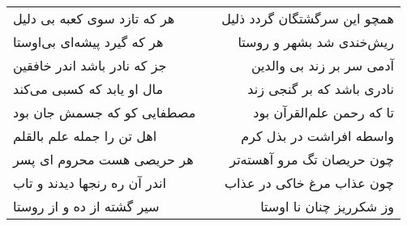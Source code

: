 \begin{center}
\begin{longtable}{l p{0.5cm} r}
هر که تازد سوی کعبه بی دلیل
&&
همچو این سرگشتگان گردد ذلیل
\\
هر که گیرد پیشه‌ای بی‌اوستا
&&
ریش‌خندی شد بشهر و روستا
\\
جز که نادر باشد اندر خافقین
&&
آدمی سر بر زند بی والدین
\\
مال او یابد که کسبی می‌کند
&&
نادری باشد که بر گنجی زند
\\
مصطفایی کو که جسمش جان بود
&&
تا که رحمن علم‌القرآن بود
\\
اهل تن را جمله علم بالقلم
&&
واسطه افراشت در بذل کرم
\\
هر حریصی هست محروم ای پسر
&&
چون حریصان تگ مرو آهسته‌تر
\\
اندر آن ره رنجها دیدند و تاب
&&
چون عذاب مرغ خاکی در عذاب
\\
سیر گشته از ده و از روستا
&&
وز شکرریز چنان نا اوستا
\\
\end{longtable}
\end{center}
